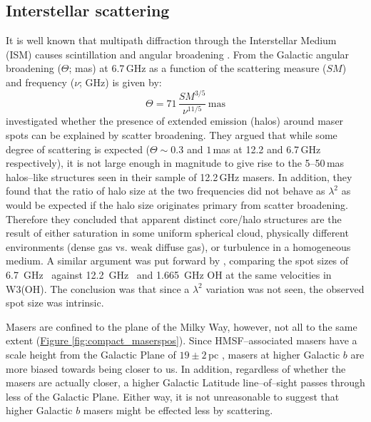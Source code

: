     \subsection{Interstellar scattering}
        It is well known that multipath diffraction through the Interstellar Medium (ISM) causes scintillation and angular broadening \citep[e.g. ][]{Cordes1991b,Fey1991,Pushkarev2015}. From \citet{Cordes2001} the Galactic angular broadening ($\Theta$; mas) at 6.7\,GHz as a function of the scattering measure ($SM$) and frequency ($\nu$; GHz) is given by:
        \begin{equation*}
	        \Theta = 71\,\frac{{SM}^{3/5}}{\nu^{11/5}}\,\text{mas}
        \end{equation*}
        \citet{Minier2002} investigated whether the presence of extended emission (halos) around maser spots can be explained by scatter broadening. They argued that while some degree of scattering is expected ($\Theta\sim0.3$ and $1$\,mas at 12.2 and 6.7\,GHz respectively), it is not large enough in magnitude to give rise to the 5--50\,mas halos--like structures seen in their sample of 12.2\,GHz masers. In addition, they found that the ratio of halo size at the two frequencies did not behave as $\lambda^2$ as would be expected if the halo size originates primary from scatter broadening. Therefore they concluded that apparent distinct core/halo structures are the result of either saturation in some uniform spherical cloud, physically different environments (dense gas vs. weak diffuse gas), or turbulence in a homogeneous medium.
        A similar argument was put forward by \citet{Menten1992}, comparing the spot sizes of 6.7~GHz \choh\, against 12.2~GHz \choh\, and 1.665~GHz OH at the same velocities in W3(OH). The conclusion was that since a $\lambda^2$ variation was not seen, the observed spot size was intrinsic.
        
        Masers are confined to the plane of the Milky Way, however, not all to the same extent (\hyperref[fig:compact_maserspos]{Figure \ref*{fig:compact_maserspos}}). Since HMSF--associated masers have a scale height from the Galactic Plane of $19\pm2$\,pc \citep{Reid2019}, masers at higher Galactic $b$ are more biased towards being closer to us. In addition, regardless of whether the masers are actually closer, a higher Galactic Latitude line--of--sight passes through less of the Galactic Plane. Either way, it is not unreasonable to suggest that higher Galactic $b$ masers might be effected less by scattering.
        
